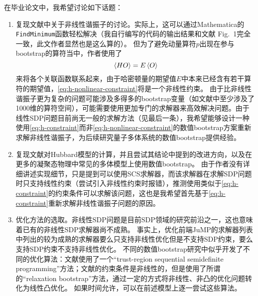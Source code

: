 \documentclass[hyperref, UTF8, a4paper]{ctexart}
\begin{document}
在毕业论文中，我希望讨论如下话题：
\begin{enumerate}
    \item 复现文献\cite{han_matrix}中关于非线性谐振子的讨论。实际上，这可以通过Mathematica的\texttt{FindMinimum}函数轻松解决（我自行编写的代码的输出结果和文献\cite{han_matrix} Fig.~1完全一致，此文作者显然也是这么算的）。
    但为了避免动量算符$p$出现在参与bootstrap的算符当中，作者使用了
    \begin{equation}
        \expval*{HO} = E \expval*{O} 
        \label{eq:h-nonlinear-constraint}
    \end{equation}
    来将各个关联函数联系起来，由于哈密顿量的期望值$E$中本来已经含有若干算符的期望值，\eqref{eq:h-nonlinear-constraint}将是一个非线性约束。
    由于比非线性谐振子更为复杂的问题可能涉及多得多的bootstrap变量（如文献\cite{han_manybody}中至少涉及了1000维的算符空间），可能需要使用更加专门的求解器来高效解决问题。由于线性SDP问题目前尚无一般的求解方法（见最后一条），我希望能够设计一种使用\eqref{eq:h-constraint}而非\eqref{eq:h-nonlinear-constraint}的数值bootstrap方案重新求解非线性谐振子，为后续研究量子多体系统的数值bootstrap提供经验。
    \item 复现文献\cite{han_manybody}对Hubbard模型的计算，并且尝试其结论中提到的改进方向，以及在更多的凝聚态物理中常见的多体模型上使用数值bootstrap。
    由于作者没有详细讲述实现细节，只是提到可以使用SCS求解器\cite{scs}，而该求解器在求解SDP问题时只支持线性约束（尝试引入非线性约束时报错），推测使用类似于\eqref{eq:h-constraint}的约束条件可以求解该问题，这也是我希望首先基于\eqref{eq:h-constraint}重新求解非线性谐振子问题的原因。
    \item 优化方法的选取。非线性SDP问题是目前SDP领域的研究前沿之一\cite{Bofill_2014}，这也意味着已有的非线性SDP求解器尚不成熟\cite{kazakov2021analytic}。
    事实上，优化前端JuMP\cite{jump}的求解器列表中列出的较为成熟的求解器要么只支持非线性优化但是不支持SDP约束，要么支持SDP约束不支持非线性优化。
    不同的数值bootstrap研究中似乎开发了不同的优化算法：文献\cite{han_matrix}使用了一个``trust-region sequential semidefinite programming''方法；文献\cite{kazakov2021analytic}的约束条件是非线性的，但是使用了所谓的``relaxation bootstrap''方法，通过一定的方式将非线性、非凸的优化问题转化为线性凸优化。
    如果时间允许，可以在前述模型上逐一尝试这些算法。
\end{enumerate}



\end{document}
